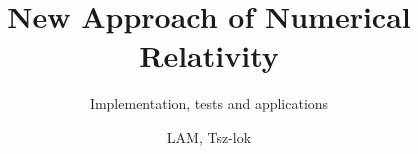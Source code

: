 \title{New Approach of Numerical Relativity}

\subtitle{Implementation, tests and applications}

\author{LAM, Tsz-lok}









     



\renewcommand{\submissiontext}{A Thesis Submitted in Partial Fulfilment \\ of the Reqirements for the Degree of}

